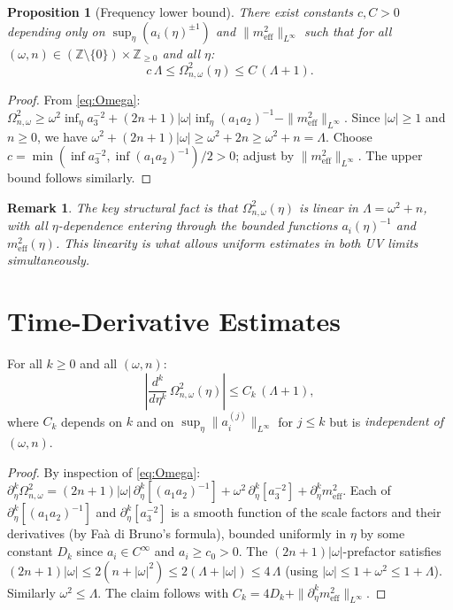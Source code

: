 \documentclass[11pt, a4paper]{article}
\newtheorem{proposition}[theorem]{Proposition}
\newtheorem{remark}[theorem]{Remark}
\newcommand{\ZZ}{\mathbb{Z}}
\newcommand{\om}{\omega}
\newcommand{\Lam}{\Lambda}
\begin{document}
\begin{proposition}[Frequency lower bound]\label{prop:freq_lower}
  There exist constants $c, C > 0$ depending only on
  $\sup_\eta (a_i(\eta)^{\pm 1})$ and $\|m_{\mathrm{eff}}^2\|_{L^\infty}$
  such that for all $(\om, n) \in (\ZZ \setminus \{0\}) \times \ZZ_{\geq 0}$
  and all $\eta$:
  \begin{equation}\label{eq:freq_bound}
    c\,\Lam \leq \Omega_{n,\om}^2(\eta) \leq C\,(\Lam + 1).
  \end{equation}
\end{proposition}

\begin{proof}
  From \eqref{eq:Omega}: $\Omega_{n,\om}^2 \geq \om^2 \inf_\eta a_3^{-2}
  + (2n+1)|\om| \inf_\eta (a_1 a_2)^{-1} - \|m_{\mathrm{eff}}^2\|_{L^\infty}$.
  Since $|\om| \geq 1$ and $n \geq 0$, we have
  $\om^2 + (2n+1)|\om| \geq \om^2 + 2n \geq \om^2 + n = \Lam$.
  Choose $c = \min(\inf a_3^{-2}, \inf (a_1 a_2)^{-1})/2 > 0$;
  adjust by $\|m_{\mathrm{eff}}^2\|_{L^\infty}$.
  The upper bound follows similarly.
\end{proof}

\begin{remark}
  The key structural fact is that $\Omega_{n,\om}^2(\eta)$ is
  \emph{linear} in $\Lam = \om^2 + n$, with all $\eta$-dependence
  entering through the bounded functions $a_i(\eta)^{-1}$ and $m_{\mathrm{eff}}^2(\eta)$.
  This linearity is what allows uniform estimates in both UV limits simultaneously.
\end{remark}

\section{Time-Derivative Estimates}

\begin{claim}\label{cl:deriv_bound}
  For all $k \geq 0$ and all $(\om, n)$:
  \begin{equation}\label{eq:deriv_bound}
    \left|\frac{d^k}{d\eta^k}\,\Omega_{n,\om}^2(\eta)\right|
    \leq C_k\,(\Lam + 1),
  \end{equation}
  where $C_k$ depends on $k$ and on $\sup_\eta \|a_i^{(j)}\|_{L^\infty}$
  for $j \leq k$ but is \emph{independent of $(\om, n)$}.
\end{claim}

\begin{proof}
  By inspection of \eqref{eq:Omega}:
  $\partial_\eta^k \Omega_{n,\om}^2 = (2n+1)|\om|\,\partial_\eta^k[(a_1 a_2)^{-1}]
  + \om^2\,\partial_\eta^k[a_3^{-2}] + \partial_\eta^k m_{\mathrm{eff}}^2$.
  Each of $\partial_\eta^k[(a_1 a_2)^{-1}]$ and $\partial_\eta^k[a_3^{-2}]$
  is a smooth function of the scale factors and their derivatives
  (by Fa\`a di Bruno's formula), bounded uniformly in $\eta$ by some constant
  $D_k$ since $a_i \in C^\infty$ and $a_i \geq c_0 > 0$.
  The $(2n+1)|\om|$-prefactor satisfies
  $(2n+1)|\om| \leq 2(n + |\om|^2) \leq 2(\Lam + |\om|) \leq 4\,\Lam$
  (using $|\om| \leq 1 + \om^2 \leq 1 + \Lam$).
  Similarly $\om^2 \leq \Lam$.
  The claim follows with $C_k = 4 D_k + \|\partial_\eta^k m_{\mathrm{eff}}^2\|_{L^\infty}$.
\end{proof}
\end{document}
